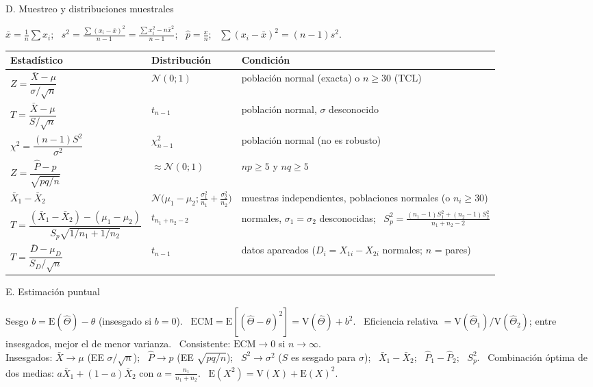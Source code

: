 \documentclass[10pt,a4paper]{extarticle}
\newcommand{\E}{\mathrm{E}}
\newcommand{\V}{\mathrm{V}}
\newcommand{\Nor}{\mathcal{N}}
\newcommand{\xb}{\bar{x}}
\newcommand{\Xb}{\bar{X}}
\newcommand{\chis}{\chi^2}
\newcommand{\sq}[1]{\sqrt{#1}}
\begin{document}
\begin{hoja}{D. Muestreo y distribuciones muestrales}
\raggedright
$\xb=\frac1n\sum x_i$; \ $s^2=\frac{\sum(x_i-\xb)^2}{n-1}=\frac{\sum x_i^2-n\xb^2}{n-1}$; \ $\hat p=\frac xn$; \ $\sum(x_i-\xb)^2=(n-1)s^2$.\\[1pt]
\renewcommand{\arraystretch}{1.55}
\begin{tabular}{@{}>{\raggedright\arraybackslash}p{5.2cm}>{\raggedright\arraybackslash}p{3.9cm}>{\raggedright\arraybackslash}p{8.2cm}@{}}
\toprule
\textbf{Estadístico} & \textbf{Distribución} & \textbf{Condición}\\\midrule
$Z=\dfrac{\Xb-\mu}{\sigma/\sq n}$ & $\Nor(0;1)$ & población normal (exacta) o $n\ge30$ (TCL)\\
$T=\dfrac{\Xb-\mu}{S/\sq n}$ & $t_{n-1}$ & población normal, $\sigma$ desconocido\\
$\chis=\dfrac{(n-1)S^2}{\sigma^2}$ & $\chis_{n-1}$ & población normal (no es robusto)\\
$Z=\dfrac{\hat P-p}{\sq{pq/n}}$ & $\approx\Nor(0;1)$ & $np\ge5$ y $nq\ge5$\\
$\Xb_1-\Xb_2$ & $\Nor\big(\mu_1-\mu_2;\frac{\sigma_1^2}{n_1}+\frac{\sigma_2^2}{n_2}\big)$ & muestras independientes, poblaciones normales (o $n_i\ge30$)\\
$T=\dfrac{(\Xb_1-\Xb_2)-(\mu_1-\mu_2)}{S_p\sq{1/n_1+1/n_2}}$ & $t_{n_1+n_2-2}$ & normales, $\sigma_1=\sigma_2$ desconocidas; \ $S_p^2=\frac{(n_1-1)S_1^2+(n_2-1)S_2^2}{n_1+n_2-2}$\\
$T=\dfrac{\bar D-\mu_D}{S_D/\sq n}$ & $t_{n-1}$ & datos apareados ($D_i=X_{1i}-X_{2i}$ normales; $n$ = pares)\\
\bottomrule
\end{tabular}
\end{hoja}

\newpage
\begin{hoja}{E. Estimación puntual}
\raggedright
Sesgo $b=\E(\hat\Theta)-\theta$ (insesgado si $b=0$). \ $\mathrm{ECM}=\E[(\hat\Theta-\theta)^2]=\V(\hat\Theta)+b^2$. \ Eficiencia relativa $=\V(\hat\Theta_1)/\V(\hat\Theta_2)$; entre insesgados, mejor el de menor varianza. \ Consistente: $\mathrm{ECM}\to0$ si $n\to\infty$.\\
Insesgados: $\Xb\to\mu$ (EE $\sigma/\sq n$); \ $\hat P\to p$ (EE $\sq{pq/n}$); \ $S^2\to\sigma^2$ ($S$ es sesgado para $\sigma$); \ $\Xb_1-\Xb_2$; \ $\hat P_1-\hat P_2$; \ $S_p^2$. \ Combinación óptima de dos medias: $a\Xb_1+(1-a)\Xb_2$ con $a=\frac{n_1}{n_1+n_2}$. \ $\E(X^2)=\V(X)+\E(X)^2$.
\end{hoja}
\end{document}

